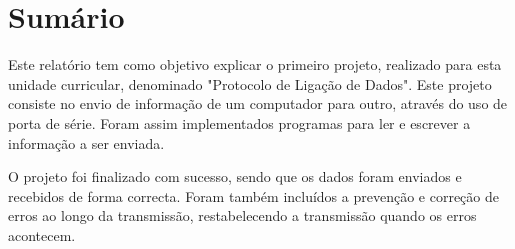 \documentclass[11pt]{article}
\begin{document}

\newpage

%
%
%
%
%
%
%


\section{Sumário}

Este relatório tem como objetivo explicar o primeiro projeto, realizado para esta unidade curricular, denominado "Protocolo de Ligação de Dados". Este projeto consiste no envio de informação de um computador para outro, através do uso de porta de série. Foram assim implementados programas para ler e escrever a informação a ser enviada.
\par O projeto foi finalizado com sucesso, sendo que os dados foram enviados e recebidos de forma correcta. Foram também incluídos a prevenção e correção de erros ao longo da transmissão, restabelecendo a transmissão quando os erros acontecem.
\end{document}
